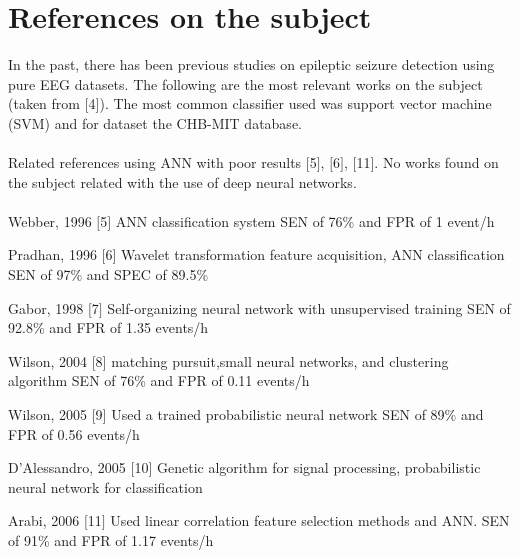 \documentclass{llncs}       %
\begin{document}
\paragraph{}\paragraph{}

\section{References on the subject}
\label{sec:1}

In the past, there has been previous studies on epileptic seizure 
detection using pure EEG datasets. The following are the most relevant 
works on the subject (taken from $[$4$]$). The most common classifier 
used was support vector machine (SVM) and for dataset the CHB-MIT 
database. 


\paragraph{}
Related references using ANN with poor results $[$5$]$, $[$6$]$, 
$[$11$]$. No works found on the subject related with the use of deep neural networks.

\paragraph{}

Webber, 1996 $[$5$]$ ANN classification system SEN of 76\% and FPR of 1 event/h 

Pradhan, 1996 $[$6$]$  Wavelet transformation feature acquisition, ANN classification SEN of 97\% and SPEC of 89.5\% 

Gabor, 1998 $[$7$]$  Self-organizing neural network with unsupervised training SEN of 92.8\% and FPR of 1.35 events/h 

Wilson, 2004 $[$8$]$   matching pursuit,small neural networks, and clustering algorithm SEN of 76\% and FPR of 0.11 events/h 

Wilson, 2005 $[$9$]$  Used a trained probabilistic neural network SEN of 89\% and FPR of 0.56 events/h 

D'Alessandro, 2005 $[$10$]$  Genetic algorithm for signal processing, probabilistic neural network for classification 

Arabi, 2006 $[$11$]$  Used linear correlation feature selection methods and ANN. SEN of 91\% and FPR of 1.17 events/h 
\end{document}
